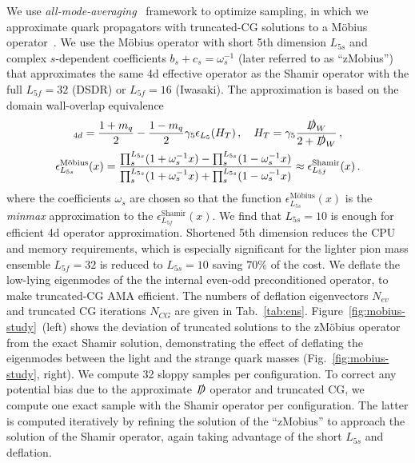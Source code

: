 \documentclass{PoS}
\newcommand{\Dslash}{{\slashed{D}}}
\begin{document}
We use \emph{all-mode-averaging}~\cite{Shintani:2014vja} framework to optimize sampling, 
in which we  approximate quark propagators with truncated-CG solutions 
to a M\"obius operator~\cite{Brower:2005qw}.
We use the M\"obius operator with short 5th dimension $L_{5s}$ and complex $s$-dependent
coefficients $b_s + c_s = \omega_s^{-1}$ (later referred to as ``zMobius'') that approximates 
the same 4d effective operator as the Shamir operator with the full $L_{5f}=32$ (DSDR) 
or $L_{5f}=16$ (Iwasaki).
The approximation is based on the domain wall-overlap equivalence
\begin{gather}
[\Dslash^\text{DWF}]_{4d} = \frac{1+m_q}2 - \frac{1-m_q}2 \gamma_5
\epsilon_{L_5}(H_T)\,,
\quad
H_T = \gamma_5\frac{\Dslash_W}{2+\Dslash_W}\,,\\
\epsilon^\text{M\"obius}_{L_{5s}}(x) 
  = \frac{\prod_s^{L_{5s}}(1+\omega_s^{-1}x) - \prod_s^{L_{5s}}(1-\omega_s^{-1}x)}
         {\prod_s^{L_{5s}}(1+\omega_s^{-1}x) + \prod_s^{L_{5s}}(1-\omega_s^{-1}x)}
  \approx \epsilon^\text{Shamir}_{L_{5f}}(x) %
  \,.
\end{gather}
where the coefficients $\omega_s$ are chosen so that the function 
$\epsilon^\text{M\"obius}_{L_{5s}}(x)$ is the \emph{minmax} approximation to the 
$\epsilon^\text{Shamir}_{L_{5f}}(x)$.
We find that $L_{5s}=10$ is enough for efficient 4d operator approximation.
Shortened 5th dimension reduces the CPU and memory requirements, which is especially significant
for the lighter pion mass ensemble $L_{5f}=32$ is reduced to $L_{5s}=10$ saving $70\%$ of
the cost.
We deflate the low-lying eigenmodes of the the internal even-odd preconditioned operator,
to make truncated-CG AMA efficient. 
The numbers of deflation eigenvectors $N_{ev}$ and truncated CG iterations $N_{CG}$ are given in
Tab.~\ref{tab:ens}.
Figure~\ref{fig:mobius-study}~(left) shows the deviation of truncated solutions to 
the zM\"obius operator from the exact Shamir solution, demonstrating the effect of deflating 
the eigenmodes between the light and the strange quark masses 
(Fig.~\ref{fig:mobius-study}, right).
We compute 32 sloppy samples per configuration. 
To correct any potential bias due to the approximate $\Dslash$ operator and truncated CG, 
we compute one exact sample with the Shamir operator per configuration.
The latter is computed iteratively by refining the solution of the ``zMobius'' 
to approach the solution of the Shamir operator, again taking advantage of the short $L_{5s}$
and deflation.
\end{document}
